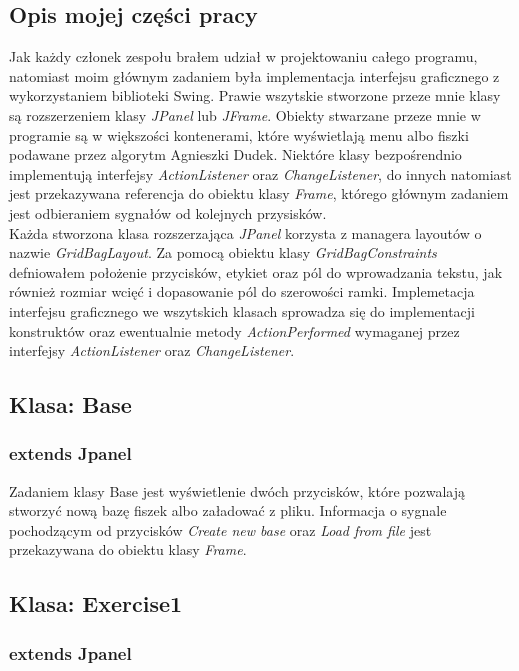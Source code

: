 \documentclass[11pt]{article}
\begin{document}
\subsection{Opis mojej części pracy}
Jak każdy członek zespołu brałem udział w projektowaniu całego programu, natomiast moim głównym zadaniem była implementacja interfejsu graficznego z wykorzystaniem biblioteki Swing. Prawie wszytskie stworzone przeze mnie klasy są rozszerzeniem klasy \textit{JPanel} lub \textit{JFrame}. Obiekty stwarzane przeze mnie w programie są w większości kontenerami, które wyświetlają menu albo fiszki podawane przez algorytm Agnieszki Dudek. Niektóre klasy bezpośrendnio implementują interfejsy \textit{ActionListener} oraz \textit{ChangeListener}, do innych natomiast jest przekazywana referencja do obiektu klasy \textit{Frame}, którego głównym zadaniem jest odbieraniem sygnałów od kolejnych przysisków. \\
Każda stworzona klasa rozszerzająca \textit{JPanel} korzysta z managera layoutów o nazwie \textit{GridBagLayout}. Za pomocą obiektu klasy \textit{GridBagConstraints} defniowałem położenie przycisków, etykiet oraz pól do wprowadzania tekstu, jak również rozmiar wcięć i dopasowanie pól do szerowości ramki.
Implemetacja interfejsu graficznego we wszytskich klasach sprowadza się do implementacji konstruktów oraz ewentualnie metody \textit{ActionPerformed} wymaganej przez interfejsy \textit{ActionListener} oraz \textit{ChangeListener}.

\subsection{Klasa: Base}
\subsubsection*{extends Jpanel}

Zadaniem klasy Base jest wyświetlenie dwóch przycisków, które pozwalają stworzyć nową bazę fiszek albo załadować z pliku. Informacja o sygnale pochodzącym od przycisków \textit{Create new base} oraz \textit{Load from file} jest przekazywana do obiektu klasy \textit{Frame}.

\subsection{Klasa: Exercise1}
\subsubsection*{extends Jpanel}
\end{document}
